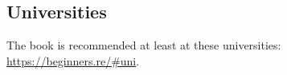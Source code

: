 \subsection*{Universities}

The book is recommended at least at these universities:
\url{https://beginners.re/\#uni}.

